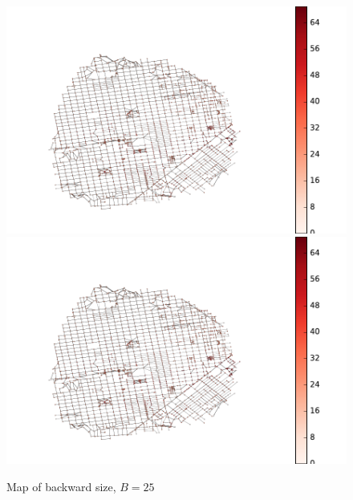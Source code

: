 \begin{figure} \caption{Map of backward size, $B=25$}\label{fig:SF_hub_size_map}
\begin{center}
\includegraphics[clip, trim=2cm 1cm 5cm 2cm,scale=0.8]{TexImg/SF_hub_sizes.pdf}
\includegraphics[clip, trim=13cm 0cm 1.1cm 0cm,scale=0.55]{TexImg/SF_hub_sizes.pdf}
\end{center}
\end{figure}